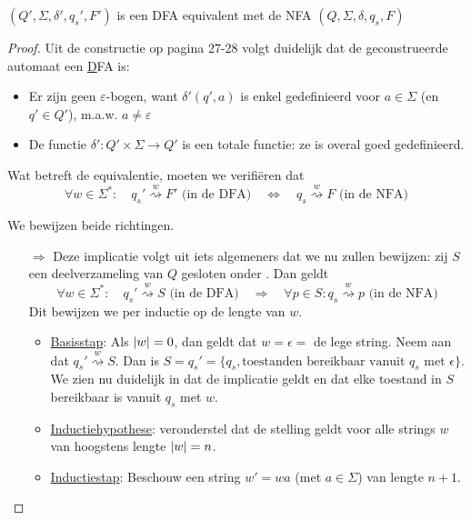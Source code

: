 \documentclass[../aanvullingen_cursus.tex]{subfiles}
\begin{document}
\begin{stelling}
	\( (Q',\Sigma, \delta', q_s',F') \) is een DFA equivalent met de NFA \((Q,\Sigma,\delta,q_s,F)\)
\end{stelling}

\begin{proof}
	Uit de constructie op pagina 27-28 volgt duidelijk dat de geconstrueerde automaat een \underline{D}FA is:
	\begin{itemize}
		\item Er zijn geen \( \varepsilon \)-bogen, want \( \delta'(q',a) \) is enkel gedefinieerd voor \( a \in \Sigma \) (en \( q'\in Q' \)), m.a.w. \( a\neq \varepsilon \)
		\item De functie \( \delta':Q' \times \Sigma \to Q' \) is een totale functie: ze is overal goed gedefinieerd.
	\end{itemize}

	Wat betreft de equivalentie, moeten we verifiëren dat \[ \forall w \in \Sigma^*: \quad q_s' \overset{w}{\rightsquigarrow} F'  \text{ (in de DFA)} \quad \Longleftrightarrow \quad q_s \overset{w}{\rightsquigarrow} F \text{ (in de NFA)}\]

	We bewijzen beide richtingen.
	\begin{enumerate}
		\item[\( \Rightarrow \)] Deze implicatie volgt uit iets algemeners dat we nu zullen bewijzen: zij \(S\) een deelverzameling van \( Q \) gesloten onder \epsilonbogen. Dan geldt \[ \forall w \in \Sigma^*: \quad q_{s}' \overset{w}{\rightsquigarrow} S \text{ (in de DFA)} \quad \Longrightarrow \quad \forall p \in S: q_s \overset{w}{\rightsquigarrow} p \text{ (in de NFA)}  \] Dit bewijzen we per inductie op de lengte van \( w \).
		\begin{itemize}
			\item \underline{Basisstap}: Als \(\lvert w \rvert=0\), dan geldt dat \(w = \epsilon = \) de lege string. Neem aan dat \(q_{s}' \overset{w}{\rightsquigarrow} S\). Dan is \(S=q_s'=\{q_s, \text{toestanden bereikbaar vanuit }q_s \text{ met }\epsilon\}\). We zien nu duidelijk in dat de implicatie geldt en dat elke toestand in \(S\) bereikbaar is vanuit \(q_s\) met \(w\).
			\item \underline{Inductiehypothese}: veronderstel dat de stelling geldt voor alle strings \(w\) van hoogstens lengte \(\lvert w \rvert=n\).
			\item \underline{Inductiestap}: Beschouw een string \(w' = wa \) (met \(a \in \Sigma\)) van lengte \(n+1\).


\end{itemize}
\end{enumerate}
\end{proof}
\end{document}

